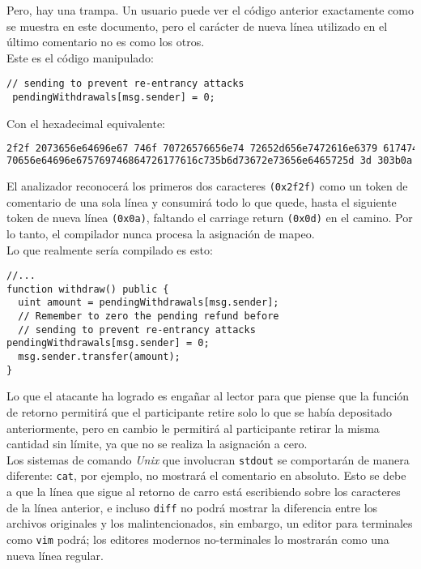 Pero, hay una trampa. Un usuario puede ver el código anterior exactamente como se muestra en este documento, pero el carácter de nueva línea utilizado en el último comentario no es como los otros.\\

Este es el código manipulado:
\begin{lstlisting}[language=Solidity, caption={Sección del código manipulado}]
// sending to prevent re-entrancy attacks
 pendingWithdrawals[msg.sender] = 0;
\end{lstlisting}

Con el hexadecimal equivalente:
\begin{lstlisting}[language=bash, caption={Hexadecimal equivalente al código manipulado}]
2f2f 2073656e64696e67 746f 70726576656e74 72652d656e7472616e6379 61747461636b730d
70656e64696e675769746864726177616c735b6d73672e73656e6465725d 3d 303b0a
\end{lstlisting}

El analizador reconocerá los primeros dos caracteres \verb|(0x2f2f)| como un token de comentario de una sola línea y consumirá todo lo que quede, hasta el siguiente token de nueva línea \verb|(0x0a)|, faltando el carriage return \verb|(0x0d)| en el camino. Por lo tanto, el compilador nunca procesa la asignación de mapeo.\\

Lo que realmente sería compilado es esto:
\begin{lstlisting}[language=Solidity, caption={Código real compilado}]
//...
function withdraw() public {
  uint amount = pendingWithdrawals[msg.sender];
  // Remember to zero the pending refund before
  // sending to prevent re-entrancy attacks pendingWithdrawals[msg.sender] = 0;
  msg.sender.transfer(amount);   
}
\end{lstlisting}

Lo que el atacante ha logrado es engañar al lector para que piense que la función de retorno permitirá que el participante retire solo lo que se había depositado anteriormente, pero en cambio le permitirá al participante retirar la misma cantidad sin límite, ya que no se realiza la asignación a cero.\\

Los sistemas de comando \textit{Unix} que involucran \verb|stdout| se comportarán de manera diferente: \verb|cat|, por ejemplo, no mostrará el comentario en absoluto. Esto se debe a que la línea que sigue al retorno de carro está escribiendo sobre los caracteres de la línea anterior, e incluso \verb|diff| no podrá mostrar la diferencia entre los archivos originales y los malintencionados, sin embargo, un editor para terminales como \verb|vim| podrá; los editores modernos no-terminales lo mostrarán como una nueva línea regular.\\

